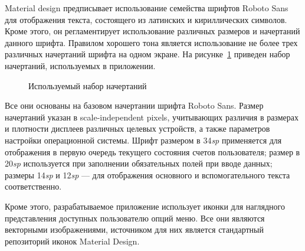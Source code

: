Material design предписывает использование семейства шрифтов
Roboto Sans для отображения текста, состоящего из латинских
и кириллических символов. Кроме этого, он регламентирует
использование различных размеров и начертаний данного шрифта.
Правилом хорошего тона является использование не более трех
различных начертаний шрифта на одном экране.
На рисунке~\ref{fig:design_fonts} приведен набор начертаний,
используемых в приложении.

\begin{figure}[h!]
  \centering
  \caption{Используемый набор начертаний}
  \label{fig:design_fonts}
\end{figure}

Все они основаны на базовом начертании шрифта Roboto Sans.
Размер начертаний указан в scale-independent pixels, учитывающих различия
в размерах и плотности дисплеев различных целевых устройств,
а также параметров настройки операционной системы.
Шрифт размером в 34\textit{sp} применяется для отображения в первую очередь
текущего состояния счетов пользователя;
размер в 20\textit{sp} используется при заполнении обязательных полей при вводе данных;
размеры 14\textit{sp} и 12\textit{sp} --- для отображения основного и вспомогательного текста
соответственно.

Кроме этого, разрабатываемое приложение использует иконки для
наглядного представления доступных пользователю опций меню.
Все они являются векторными изображениями, источником для них
является стандартный репозиторий иконок Material Design.